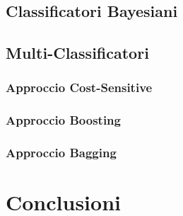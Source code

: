   \subsection{Classificatori Bayesiani}
  \subsection{Multi-Classificatori}
  \subsubsection{Approccio Cost-Sensitive}
  \subsubsection{Approccio Boosting}
  \subsubsection{Approccio Bagging}
  \section{Conclusioni}
  

